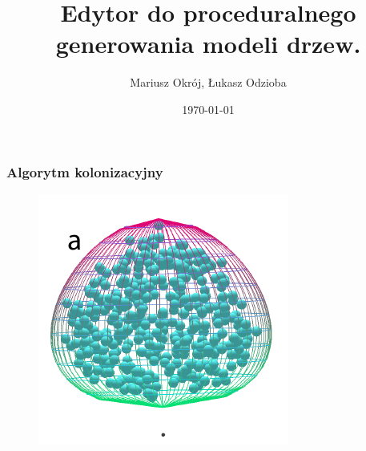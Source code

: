 \documentclass[blue,table]{beamer}
\begin{document}
\title{Edytor do proceduralnego generowania modeli drzew.}
\author{Mariusz Okrój, Łukasz Odzioba}
\date{\today} 

\begin{frame}
\titlepage
\end{frame}


\begin{frame}\frametitle{Algorytm kolonizacyjny}
\begin{figure}
\includegraphics[scale=0.5]{img/colonization_1.png} 
\end{figure}
\end{frame}
\end{document}
